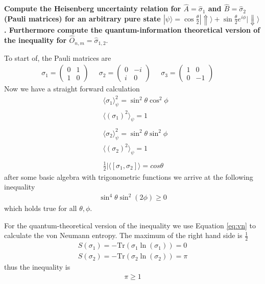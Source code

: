 \documentclass[a4paper]{article}
\newcounter{exercise}
\newenvironment{MyExercise}%
{\begin{mdframed}[style=exercisestyle]}{\end{mdframed}}
\begin{document}
\begin{MyExercise}
    \textbf{Compute the Heisenberg uncertainty relation for $\hat{A} =
    \hat{\sigma}_{1}$ and $\hat{B} = \hat{\sigma}_{2}$ (Pauli matrices) for an
    arbitrary pure state $|\psi \rangle = \cos\frac{\theta}{2} |\Uparrow\rangle
    + \sin\frac{\theta}{2} e^{i\phi} |\Downarrow\rangle$. Furthermore compute
    the quantum-information theoretical version of the inequality for
    $\hat{O}_{n,m} = \hat{\sigma}_{1, 2}$}.
    \newline

    To start of, the Pauli matrices are
    \begin{align}
        \sigma_1 =
        \begin{pmatrix}
            0 & 1\\ 1& 0
        \end{pmatrix} \;\;\;\;\;
        \sigma_2 =
        \begin{pmatrix}
            0 & -i \\ i & 0
        \end{pmatrix} \;\;\;\;\;
        \sigma_3 =
        \begin{pmatrix}
            1&0\\ 0& -1
        \end{pmatrix} \;\;\;\;\;
    \end{align}
    Now we have a straight forward calculation
    \begin{align}
        &\langle \sigma_1\rangle^2_\psi = \sin^2 \theta \cos^2 \phi\\
        &\langle (\sigma_1)^2\rangle_\psi = 1\\
        \nonumber \\
        &\langle \sigma_2\rangle_\psi^2 = \sin^2\theta \sin^2\phi\\
        &\langle (\sigma_2)^2\rangle_\psi = 1\\
        \nonumber \\
        &\frac{1}{2} |\langle[\sigma_1, \sigma_2]\rangle = cos\theta
    \end{align}
    after some basic algebra with trigonometric functions we arrive at the
    following inequality
    \begin{align}
        \sin^4\theta \sin^2(2\phi) \geq 0
    \end{align}
    which holds true for all $\theta, \phi$.

    For the quantum-theoretical version of the inequality we use Equation
    \ref{eq:vn} to calculate the von Neumann entropy. The maximum of the right
    hand side is $\frac{1}{2}$
    \begin{align}
        S(\sigma_1) = -\text{Tr}(\sigma_1\ln(\sigma_1)) = 0\\
        S(\sigma_2) = -\text{Tr}(\sigma_2\ln(\sigma_2)) = \pi
    \end{align}
    thus the inequality is
    \begin{align}
        \pi \geq 1
    \end{align}


\end{MyExercise}
\end{document}
